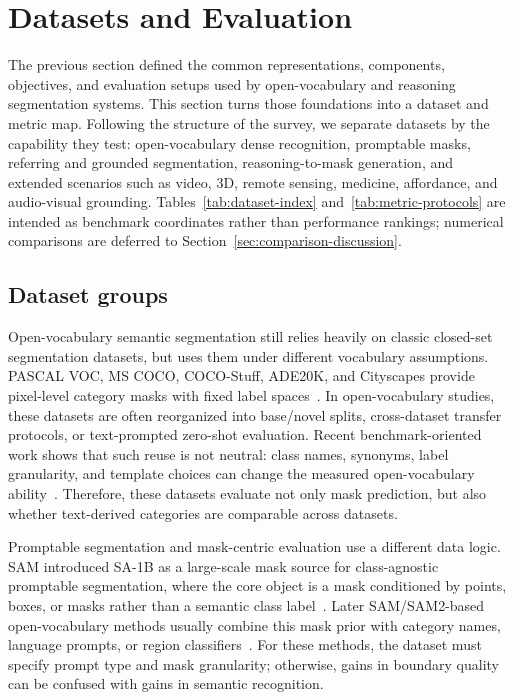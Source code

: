 \section{Datasets and Evaluation}
\label{sec:datasets-evaluation}

The previous section defined the common representations, components, objectives, and evaluation setups used by open-vocabulary and reasoning segmentation systems. This section turns those foundations into a dataset and metric map. Following the structure of the survey, we separate datasets by the capability they test: open-vocabulary dense recognition, promptable masks, referring and grounded segmentation, reasoning-to-mask generation, and extended scenarios such as video, 3D, remote sensing, medicine, affordance, and audio-visual grounding. Tables~\ref{tab:dataset-index} and~\ref{tab:metric-protocols} are intended as benchmark coordinates rather than performance rankings; numerical comparisons are deferred to Section~\ref{sec:comparison-discussion}.

\subsection{Dataset groups}

Open-vocabulary semantic segmentation still relies heavily on classic closed-set segmentation datasets, but uses them under different vocabulary assumptions. PASCAL VOC, MS COCO, COCO-Stuff, ADE20K, and Cityscapes provide pixel-level category masks with fixed label spaces~\citep{everingham2015pascal,lin2014microsoft,caesar2018cocostuff,zhou2017scene,cordts2016cityscapes}. In open-vocabulary studies, these datasets are often reorganized into base/novel splits, cross-dataset transfer protocols, or text-prompted zero-shot evaluation. Recent benchmark-oriented work shows that such reuse is not neutral: class names, synonyms, label granularity, and template choices can change the measured open-vocabulary ability~\citep{hhuangRenovatingNamesOpenvocabulary2024,noorimTesttimeAdaptationVisionlanguage2026,ybenigmimFlossFreeLunch2025}. Therefore, these datasets evaluate not only mask prediction, but also whether text-derived categories are comparable across datasets.

Promptable segmentation and mask-centric evaluation use a different data logic. SAM introduced SA-1B as a large-scale mask source for class-agnostic promptable segmentation, where the core object is a mask conditioned by points, boxes, or masks rather than a semantic class label~\citep{kirillov2023sam}. Later SAM/SAM2-based open-vocabulary methods usually combine this mask prior with category names, language prompts, or region classifiers~\citep{xhanBoostingSegmentAnything2025,hwangXSAMSegmentAnything2026,sgxiaoOpenworldsamExtendingSam22026}. For these methods, the dataset must specify prompt type and mask granularity; otherwise, gains in boundary quality can be confused with gains in semantic recognition.


